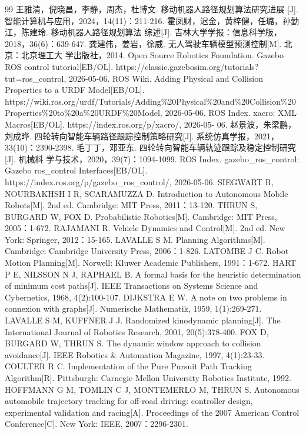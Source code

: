 \begin{thebibliography}{99}
 王雅清，倪晓昌，李静，周杰，杜博文. 移动机器人路径规划算法研究进展 [J]. 智能计算机与应用，2024，14(11)：211-216.
 霍凤财，迟金，黄梓健，任璐，孙勤江，陈建玲. 移动机器人路径规划算法 综述[J]. 吉林大学学报：信息科学版，2018，36(6)：639-647.
 龚建伟，姜岩，徐威. 无人驾驶车辆模型预测控制[M]. 北京：北京理工大 学出版社，2014.
 Open Source Robotics Foundation. Gazebo ROS control tutorial[EB/OL]. https://classic.gazebosim.org/tutorials?tut=ros\_control, 2026-05-06.
 ROS Wiki. Adding Physical and Collision Properties to a URDF Model[EB/OL]. https://wiki.ros.org/urdf/Tutorials/Adding\%20Physical\%20and\%20Collision\%20 Properties\%20to\%20a\%20URDF\%20Model, 2026-05-06.
 ROS Index. xacro: XML Macros[EB/OL]. https://index.ros.org/p/xacro/, 2026-05- 06.
 赵景波，朱梁鹏，刘成晔. 四轮转向智能车辆路径跟踪控制策略研究[J]. 系统仿真学报，2021，33(10)：2390-2398.
 毛丁丁，邓亚东. 四轮转向智能车辆轨迹跟踪及稳定控制研究[J]. 机械科 学与技术，2020，39(7)：1094-1099.
 ROS Index. gazebo\_ros\_control: Gazebo ros\_control Interfaces[EB/OL]. https://index.ros.org/p/gazebo\_ros\_control/, 2026-05-06.
 SIEGWART R, NOURBAKHSH I R, SCARAMUZZA D. Introduction to Autonomous Mobile Robots[M]. 2nd ed. Cambridge: MIT Press, 2011：13-120.
 THRUN S, BURGARD W, FOX D. Probabilistic Robotics[M]. Cambridge: MIT Press, 2005：1-672.
 RAJAMANI R. Vehicle Dynamics and Control[M]. 2nd ed. New York: Springer, 2012：15-165.
 LAVALLE S M. Planning Algorithms[M]. Cambridge: Cambridge University Press, 2006：1-826.
 LATOMBE J C. Robot Motion Planning[M]. Norwell: Kluwer Academic Publishers, 1991：1-672.
 HART P E, NILSSON N J, RAPHAEL B. A formal basis for the heuristic determination of minimum cost paths[J]. IEEE Transactions on Systems Science and Cybernetics, 1968, 4(2):100-107.
 DIJKSTRA E W. A note on two problems in connexion with graphs[J]. Numerische Mathematik, 1959, 1(1):269-271.
 LAVALLE S M, KUFFNER J J. Randomized kinodynamic planning[J]. The International Journal of Robotics Research, 2001, 20(5):378-400.
 FOX D, BURGARD W, THRUN S. The dynamic window approach to collision avoidance[J]. IEEE Robotics \& Automation Magazine, 1997, 4(1):23-33.
 COULTER R C. Implementation of the Pure Pursuit Path Tracking Algorithm[R]. Pittsburgh: Carnegie Mellon University Robotics Institute, 1992.
 HOFFMANN G M, TOMLIN C J, MONTEMERLO M, THRUN S. Autonomous automobile trajectory tracking for off-road driving: controller design, experimental validation and racing[A]. Proceedings of the 2007 American Control Conference[C]. New York: IEEE, 2007：2296-2301.

\end{thebibliography}
